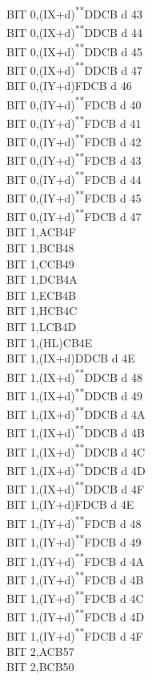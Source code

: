 \documentclass[12pt,twoside,openright,a4paper]{book}
\newcommand{\UNDOC}{\textnormal{\textsuperscript{**}}}
\begin{document}
\begin{multicols}{3}
{\begin{tabbing}
		BIT 0,(IX+d)\UNDOC\>DDCB d 43\\
		BIT 0,(IX+d)\UNDOC\>DDCB d 44\\
		BIT 0,(IX+d)\UNDOC\>DDCB d 45\\
		BIT 0,(IX+d)\UNDOC\>DDCB d 47\\
		BIT 0,(IY+d)\>FDCB d 46\\
		BIT 0,(IY+d)\UNDOC\>FDCB d 40\\
		BIT 0,(IY+d)\UNDOC\>FDCB d 41\\
		BIT 0,(IY+d)\UNDOC\>FDCB d 42\\
		BIT 0,(IY+d)\UNDOC\>FDCB d 43\\
		BIT 0,(IY+d)\UNDOC\>FDCB d 44\\
		BIT 0,(IY+d)\UNDOC\>FDCB d 45\\
		BIT 0,(IY+d)\UNDOC\>FDCB d 47\\
		BIT 1,A\>CB4F\\
		BIT 1,B\>CB48\\
		BIT 1,C\>CB49\\
		BIT 1,D\>CB4A\\
		BIT 1,E\>CB4B\\
		BIT 1,H\>CB4C\\
		BIT 1,L\>CB4D\\
		BIT 1,(HL)\>CB4E\\
		BIT 1,(IX+d)\>DDCB d 4E\\
		BIT 1,(IX+d)\UNDOC\>DDCB d 48\\
		BIT 1,(IX+d)\UNDOC\>DDCB d 49\\
		BIT 1,(IX+d)\UNDOC\>DDCB d 4A\\
		BIT 1,(IX+d)\UNDOC\>DDCB d 4B\\
		BIT 1,(IX+d)\UNDOC\>DDCB d 4C\\
		BIT 1,(IX+d)\UNDOC\>DDCB d 4D\\
		BIT 1,(IX+d)\UNDOC\>DDCB d 4F\\
		BIT 1,(IY+d)\>FDCB d 4E\\
		BIT 1,(IY+d)\UNDOC\>FDCB d 48\\
		BIT 1,(IY+d)\UNDOC\>FDCB d 49\\
		BIT 1,(IY+d)\UNDOC\>FDCB d 4A\\
		BIT 1,(IY+d)\UNDOC\>FDCB d 4B\\
		BIT 1,(IY+d)\UNDOC\>FDCB d 4C\\
		BIT 1,(IY+d)\UNDOC\>FDCB d 4D\\
		BIT 1,(IY+d)\UNDOC\>FDCB d 4F\\
		BIT 2,A\>CB57\\
		BIT 2,B\>CB50\\

\end{tabbing}}
\end{multicols}
\end{document}
